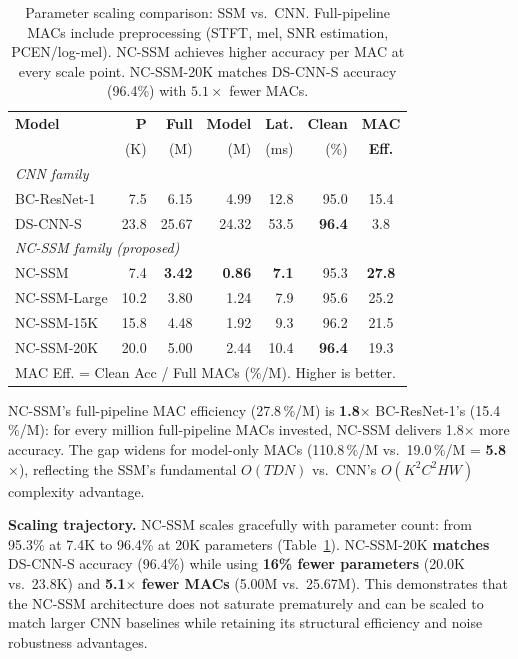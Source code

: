 \documentclass[journal]{IEEEtran}
\begin{document}
\begin{table}[t]
\centering
\caption{Parameter scaling comparison: SSM vs.\ CNN. Full-pipeline MACs include preprocessing (STFT, mel, SNR estimation, PCEN/log-mel). NC-SSM achieves higher accuracy per MAC at every scale point. NC-SSM-20K matches DS-CNN-S accuracy (96.4\%) with $5.1\times$ fewer MACs.}
\label{tab:scaling}
\small
\setlength{\tabcolsep}{2.8pt}
\begin{tabular}{lrrrrrc}
\toprule
\textbf{Model} & \textbf{P} & \textbf{Full} & \textbf{Model} & \textbf{Lat.} & \textbf{Clean} & \textbf{MAC}\\
               & (K)       & (M)          & (M)           & (ms)         & (\%)          & \textbf{Eff.} \\
\midrule
\multicolumn{7}{l}{\textit{CNN family}} \\
BC-ResNet-1    & 7.5  & 6.15 & 4.99 & 12.8 & 95.0 & 15.4 \\
DS-CNN-S       & 23.8 & 25.67 & 24.32 & 53.5 & \textbf{96.4} & 3.8 \\
\midrule
\multicolumn{7}{l}{\textit{NC-SSM family (proposed)}} \\
NC-SSM         & 7.4  & \textbf{3.42} & \textbf{0.86} & \textbf{7.1}  & 95.3 & \textbf{27.8} \\
NC-SSM-Large   & 10.2 & 3.80 & 1.24 & 7.9  & 95.6 & 25.2 \\
NC-SSM-15K     & 15.8 & 4.48 & 1.92 & 9.3  & 96.2 & 21.5 \\
NC-SSM-20K     & 20.0 & 5.00 & 2.44 & 10.4 & \textbf{96.4} & 19.3 \\
\bottomrule
\multicolumn{7}{l}{\small MAC Eff. = Clean Acc / Full MACs (\%/M). Higher is better.}
\end{tabular}
\end{table}

NC-SSM's full-pipeline MAC efficiency (27.8\,\%/M) is \textbf{1.8$\times$} BC-ResNet-1's (15.4\,\%/M): for every million full-pipeline MACs invested, NC-SSM delivers 1.8$\times$ more accuracy.
The gap widens for model-only MACs (110.8\,\%/M vs.\ 19.0\,\%/M = \textbf{5.8$\times$}), reflecting the SSM's fundamental $O(TDN)$ vs.\ CNN's $O(K^2C^2HW)$ complexity advantage.

\smallskip\noindent\textbf{Scaling trajectory.}
NC-SSM scales gracefully with parameter count: from 95.3\% at 7.4K to 96.4\% at 20K parameters (Table~\ref{tab:scaling}).
NC-SSM-20K \textbf{matches} DS-CNN-S accuracy (96.4\%) while using \textbf{16\% fewer parameters} (20.0K vs.\ 23.8K) and \textbf{5.1$\times$ fewer MACs} (5.00M vs.\ 25.67M).
This demonstrates that the NC-SSM architecture does not saturate prematurely and can be scaled to match larger CNN baselines while retaining its structural efficiency and noise robustness advantages.
\end{document}
